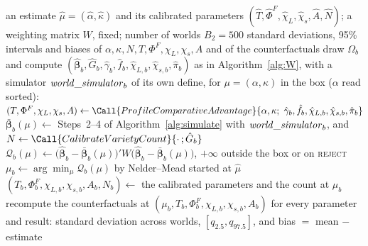 \begin{algorithm}[H]
\caption{\textsc{WorldBootstrap}: inference by parametric bootstrap}
\label{alg:boot}
\small
\begin{algorithmic}[1]
\Require an estimate $\hat\mu=(\hat\alpha,\hat\kappa)$ and its calibrated parameters $(\hat T,\hat\Phi^F,\hat\chi_L,\hat\chi_s,\hat A,\hat N)$; a weighting matrix $W$, fixed; number of worlds $B_2=500$
\Ensure standard deviations, 95\% intervals and biases of $\alpha,\kappa,N,T,\Phi^F,\chi_L,\chi_s,A$ and of the counterfactuals
    \State draw $\Omega_b$ and compute $(\hat{\boldsymbol\beta}_b,\hat G_b,\hat\gamma_b,\hat f_b,\hat\chi_{L,b},\hat\chi_{s,b},\hat\pi_b)$ as in Algorithm~\ref{alg:W}, with a simulator $\mathit{world\_simulator}_b$ of its own
    \State define, for $\mu=(\alpha,\kappa)$ in the box ($\alpha$ read sorted):
    \State \quad $(T,\Phi^F,\chi_L,\chi_s,A)\gets\Call{ProfileComparativeAdvantage}{\alpha,\kappa;\ \hat\gamma_b,\hat f_b,\hat\chi_{L,b},\hat\chi_{s,b},\hat\pi_b}$
    \State \quad $\bar{\boldsymbol\beta}_b(\mu)\gets$ Steps~2--4 of Algorithm~\ref{alg:simulate} with $\mathit{world\_simulator}_b$, and $N\gets\Call{CalibrateVarietyCount}{\cdot\,;\hat G_b}$
    \State \quad $\mathcal{Q}_b(\mu)\gets\bigl(\hat{\boldsymbol\beta}_b-\bar{\boldsymbol\beta}_b(\mu)\bigr)'W\bigl(\hat{\boldsymbol\beta}_b-\bar{\boldsymbol\beta}_b(\mu)\bigr)$, $+\infty$ outside the box or on \textsc{reject}
    \State $\mu_b\gets\arg\min_\mu\mathcal{Q}_b(\mu)$ by Nelder--Mead started at $\hat\mu$
    \State $(T_b,\Phi^F_b,\chi_{L,b},\chi_{s,b},A_b,N_b)\gets$ the calibrated parameters and the count at $\mu_b$
    \State recompute the counterfactuals at $(\mu_b,T_b,\Phi^F_b,\chi_{L,b},\chi_{s,b},A_b)$
\EndFor
\State for every parameter and result: standard deviation across worlds, $[q_{2.5},q_{97.5}]$, and bias $=$ mean $-$ estimate
\end{algorithmic}
\end{algorithm}

